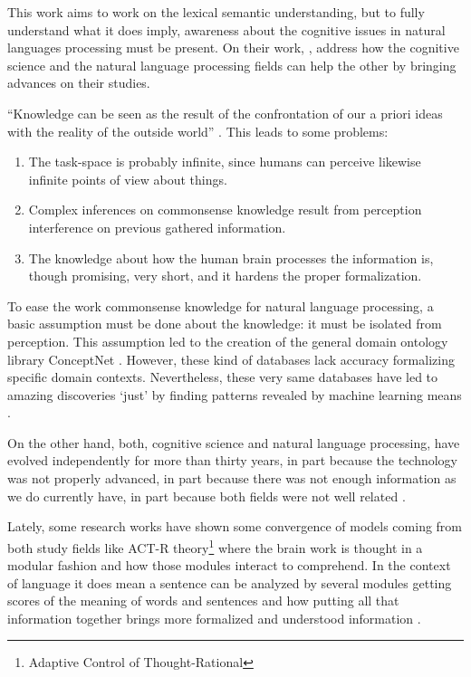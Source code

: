 \documentclass[runningheads]{llncs}
\begin{document}
This work aims to work on the lexical semantic understanding, but to fully understand what it does imply, awareness about the cognitive issues in natural languages processing must be present. On their work, \cite{Poibeau2016}, address how the cognitive science and the natural language processing fields can help the other by bringing advances on their studies.

``Knowledge can be seen as the result of the confrontation of our a priori
ideas with the reality of the outside world'' \cite{Poibeau2016}. This leads to some problems:

\begin{enumerate}
	\item The task-space is probably infinite, since humans can perceive likewise infinite points of view about things.
	\item Complex inferences on commonsense knowledge result from perception interference on previous gathered information.
	\item The knowledge about how the human brain processes the information is, though promising, very short, and it hardens the proper formalization.
\end{enumerate}

To ease the work commonsense knowledge for natural language processing, a basic assumption must be done about the knowledge: it must be isolated from perception. This assumption led to the creation of the general domain ontology library ConceptNet \cite{Speer2016}. However, these kind of databases lack accuracy formalizing specific domain contexts. Nevertheless, these very same databases have led to amazing discoveries `just' by finding patterns revealed by machine learning means \cite{Poibeau2016}.

On the other hand, both, cognitive science and natural language processing, have evolved independently for more than thirty years, in part because the technology was not properly advanced, in part because there was not enough information as we do currently have, in part because both fields were not well related \cite{Poibeau2016}.

Lately, some research works have shown some convergence of models coming from both study fields like ACT-R theory\footnote{Adaptive Control of Thought-Rational} where the brain work is thought in a modular fashion and how those modules interact to comprehend. In the context of language it does mean a sentence can be analyzed by several modules getting scores of the meaning of words and sentences and how putting all that information together brings more formalized and understood information \cite{Poibeau2016}.
\end{document}
